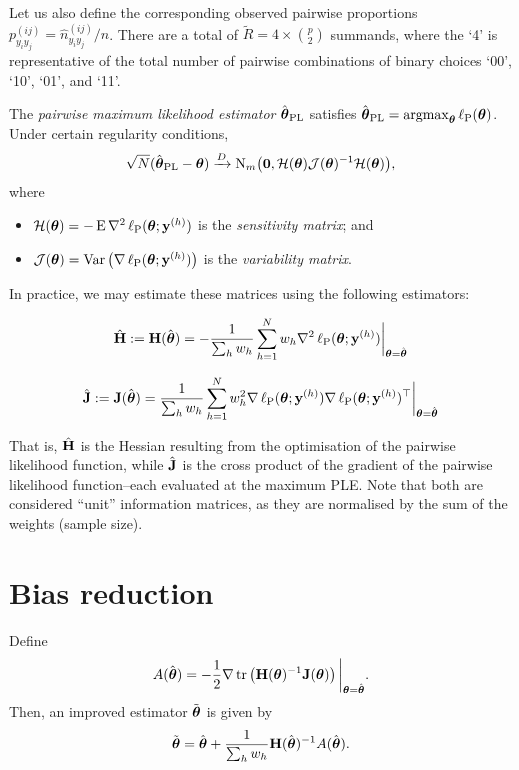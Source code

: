\documentclass[
]{article}
\providecommand{\tightlist}{%
  \setlength{\itemsep}{0pt}\setlength{\parskip}{0pt}}
\begin{document}
Let us also define the corresponding observed pairwise proportions
\(p_{y_iy_j}^{(ij)} = \hat n_{y_iy_j}^{(ij)}/n\). There are a total of
\(\tilde R = 4 \times {p \choose 2}\) summands, where the `4' is
representative of the total number of pairwise combinations of binary
choices `00', `10', `01', and `11'.

The \emph{pairwise maximum likelihood estimator}
\(\hat{{\boldsymbol\theta}}_{\text{PL}}\) satisfies
\(\hat{{\boldsymbol\theta}}_{\text{PL}}= \operatorname{argmax}_{{\boldsymbol\theta}} \operatorname{\ell_P}({\boldsymbol\theta})\).
Under certain regularity conditions, \begin{equation}
\sqrt N (\hat{{\boldsymbol\theta}}_{\text{PL}}- {\boldsymbol\theta}) \xrightarrow{D} {\operatorname{N}}_m\big({\mathbf 0}, {\mathcal H}({\boldsymbol\theta}){\mathcal J}({\boldsymbol\theta})^{-1}{\mathcal H}({\boldsymbol\theta})\big),
\end{equation} where

\begin{itemize}
\tightlist
\item
  \({\mathcal H}({\boldsymbol\theta})=-\operatorname{E}\nabla^2\operatorname{\ell_P}({\boldsymbol\theta};{\mathbf y}^{(h)})\)
  is the \emph{sensitivity matrix}; and
\item
  \({\mathcal J}({\boldsymbol\theta})=\operatorname{Var}\big( \nabla\operatorname{\ell_P}({\boldsymbol\theta};{\mathbf y}^{(h)})\big)\)
  is the \emph{variability matrix}.
\end{itemize}

In practice, we may estimate these matrices using the following
estimators:

\[
\hat{{\mathbf H}} := {\mathbf H}(\hat{{\boldsymbol\theta}})  = -\frac{1}{\sum_h w_h}\sum_{h=1}^N w_h\nabla^2\operatorname{\ell_P}({\boldsymbol\theta};{\mathbf y}^{(h)}) \bigg|_{{\boldsymbol\theta} = \hat{{\boldsymbol\theta}}}
\]

\[
\hat{{\mathbf J}} := {\mathbf J}(\hat{{\boldsymbol\theta}}) = \frac{1}{\sum_h w_h}\sum_{h=1}^N w_h^2\nabla\operatorname{\ell_P}({\boldsymbol\theta};{\mathbf y}^{(h)})\nabla\operatorname{\ell_P}({\boldsymbol\theta};{\mathbf y}^{(h)})^\top \bigg|_{{\boldsymbol\theta} = \hat{{\boldsymbol\theta}}}
\]

That is, \(\hat{{\mathbf H}}\) is the Hessian resulting from the optimisation of
the pairwise likelihood function, while \(\hat{{\mathbf J}}\) is the cross product
of the gradient of the pairwise likelihood function--each evaluated at
the maximum PLE. Note that both are considered ``unit'' information
matrices, as they are normalised by the sum of the weights (sample
size).

\section{Bias reduction}\label{bias-reduction}

Define \[
A(\hat{{\boldsymbol\theta}}) = - \frac{1}{2} \nabla \operatorname{tr}\left( {\mathbf H}({\boldsymbol\theta})^{-1}{\mathbf J}({\boldsymbol\theta}) \right) \bigg|_{{\boldsymbol\theta} = \hat{{\boldsymbol\theta}}} .
\] Then, an improved estimator \(\tilde{{\boldsymbol\theta}}\) is given by \[
\tilde{{\boldsymbol\theta}} = \hat{{\boldsymbol\theta}} + \frac{1}{\sum_h w_h} {\mathbf H}(\hat{{\boldsymbol\theta}})^{-1}A(\hat{{\boldsymbol\theta}}).
\]
\end{document}
